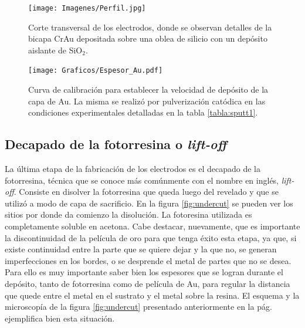 						  \begin{figure}[th!]
						  \begin{center}
						  \texttt{[image: Imagenes/Perfil.jpg]}
						  \caption[Sección trasversal de los eletrodos]{Corte transversal de los electrodos, donde se observan detalles de la bicapa Cr\textbar Au depositada sobre una oblea de silicio con un depósito aislante de SiO$_2$.}
						  \label{fig:FIB_electrodos}
						  \end{center}
						  \end{figure} 	

					   		\begin{figure}[th!]
					   		\begin{center}
							\texttt{[image: Graficos/Espesor\_Au.pdf]}
							\caption[Curva de calibración para el espesor de los electrodos]{Curva de calibración para establecer la velocidad de depósito de la capa de Au. La misma se realizó por pulverización catódica en las condiciones experimentales detalladas en la tabla \ref{tabla:sputt1}.}
							\label{fig:calibracionAu}
							\end{center}
							\end{figure}		  
		
	\subsection{Decapado de la fotorresina o\textit{ lift-off}}

		 La última etapa de la fabricación de los electrodos es el decapado de la fotorresina, técnica que se conoce más comúnmente con el nombre en inglés, \textit{lift-off}. Consiste en disolver la fotorresina que queda luego del revelado y que se utilizó a modo de capa de sacrificio. En la figura \ref{fig:undercut} se pueden ver los sitios por donde da comienzo la disolución. La fotoresina utilizada es completamente soluble en acetona. Cabe destacar, nuevamente, que es importante la discontinuidad de la película de oro para que tenga éxito esta etapa, ya que, si existe continuidad entre la parte que se quiere dejar y la que no, se generan imperfecciones en los bordes, o se desprende el metal de partes que no se desea. Para ello es muy importante saber bien los espesores que se logran durante el depósito, tanto de fotorresina como de película de Au, para regular la distancia que quede entre el metal en el sustrato y el metal sobre la resina. El esquema y la microscopía de la figura \ref{fig:undercut} presentado anteriormente en la pág. \pageref{fig:undercut} ejemplifica bien esta situación.

